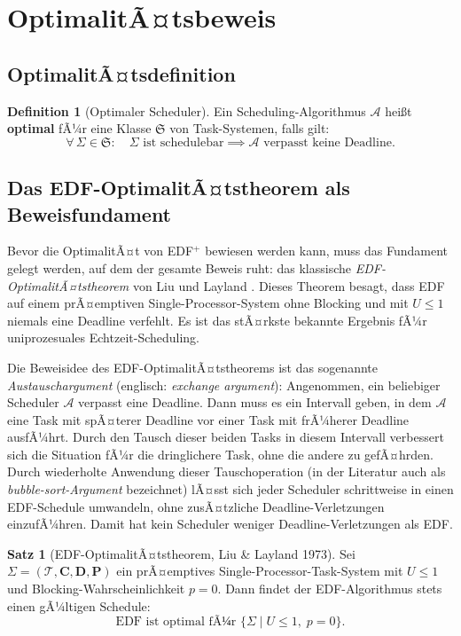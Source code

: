 ﻿\documentclass[a4paper,12pt]{article}
\theoremstyle{definition}
\newtheorem{definition}{Definition}
\newtheorem{satz}{Satz}
\begin{document}
	\section{OptimalitÃ¤tsbeweis}

	\subsection{OptimalitÃ¤tsdefinition}

	\begin{definition}[Optimaler Scheduler]
		Ein Scheduling-Algorithmus $\mathcal{A}$ hei\ss{}t \textbf{optimal} fÃ¼r eine
		Klasse $\mathfrak{S}$ von Task-Systemen, falls gilt:
		\[
		\forall\, \Sigma \in \mathfrak{S}: \quad
		\Sigma \text{ ist schedulebar} \implies \mathcal{A} \text{ verpasst keine Deadline}.
		\]
	\end{definition}

	\subsection{Das EDF-OptimalitÃ¤tstheorem als Beweisfundament}
	\label{subsec:edf_fundament}

	Bevor die OptimalitÃ¤t von EDF$^+$ bewiesen werden kann, muss das
	Fundament gelegt werden, auf dem der gesamte Beweis ruht: das klassische
	\emph{EDF-OptimalitÃ¤tstheorem} von Liu und Layland \cite{Liu1973}.
	Dieses Theorem besagt, dass EDF auf einem prÃ¤emptiven Single-Processor-System
	ohne Blo\-cking und mit $U \le 1$ niemals eine Deadline verfehlt. Es ist das
	stÃ¤rkste bekannte Ergebnis fÃ¼r uniprozesuales Echtzeit-Scheduling.

	Die Beweisidee des EDF-OptimalitÃ¤tstheorems ist das sogenannte
	\emph{Austauschargument} (englisch: \emph{exchange argument}): Angenommen,
	ein beliebiger Scheduler $\mathcal{A}$ verpasst eine Deadline. Dann muss es
	ein Intervall geben, in dem $\mathcal{A}$ eine Task mit spÃ¤terer Deadline
	vor einer Task mit frÃ¼herer Deadline ausfÃ¼hrt. Durch den Tausch dieser
	beiden Tasks in diesem Intervall verbessert sich die Situation fÃ¼r die
	dringlichere Task, ohne die andere zu gefÃ¤hrden. Durch wiederholte Anwendung
	dieser Tauschoperation (in der Literatur auch als \emph{bubble-sort-Argument}
	bezeichnet) lÃ¤sst sich jeder Scheduler schrittweise in einen EDF-Schedule
	umwandeln, ohne zusÃ¤tzliche Deadline-Verletzungen einzufÃ¼hren. Damit hat
	kein Scheduler weniger Deadline-Verletzungen als EDF.

	\begin{satz}[EDF-OptimalitÃ¤tstheorem, Liu \& Layland 1973]
		\label{satz:edf_optimal}
		Sei $\Sigma = (\mathcal{T}, \mathbf{C}, \mathbf{D}, \mathbf{P})$ ein
		prÃ¤emptives Single-Processor-Task-System mit $U \le 1$ und Blocking-Wahrscheinlichkeit
		$p = 0$. Dann findet der EDF-Algorithmus stets einen gÃ¼ltigen Schedule:
		\[
		\text{EDF ist optimal fÃ¼r } \bigl\{\Sigma \mid U \le 1,\; p = 0\bigr\}.
		\]
	\end{satz}
\end{document}
